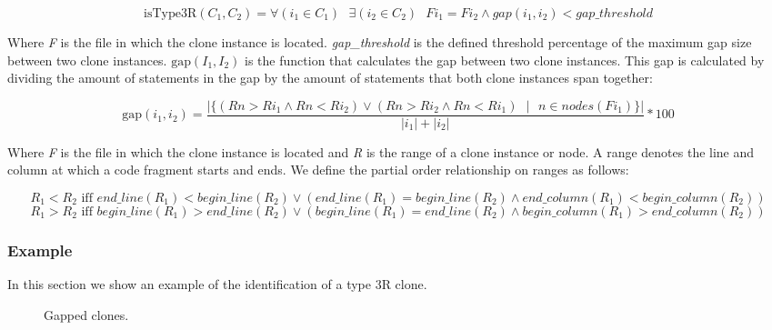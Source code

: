 \begin{equation}\label{eq:istype3r}
\text{isType3R}(C_1, C_2) = \forall (i_1 \in C_1)\text{ } \exists (i_2 \in C_2)\text{ } Fi_1 = Fi_2 \land gap(i_1, i_2) < gap\_threshold
\end{equation}

Where \textit{F} is the file in which the clone instance is located. \textit{gap\_threshold} is the defined threshold percentage of the maximum gap size between two clone instances. $\text{gap}(I_1, I_2)$ is the function that calculates the gap between two clone instances. This gap is calculated by dividing the amount of statements in the gap by the amount of statements that both clone instances span together:

\begin{equation}\label{eq:t3rgap}
\text{gap}(i_1, i_2) = \frac{|\{(Rn>Ri_1 \land Rn<Ri_2) \lor (Rn>Ri_2 \land Rn<Ri_1)\text{ }|\text{ } n \in nodes(Fi_1)\}|}{|i_1| + |i_2|} * 100
\end{equation}

Where \textit{F} is the file in which the clone instance is located and \textit{R} is the range of a clone instance or node. A range denotes the line and column at which a code fragment starts and ends. We define the partial order relationship on ranges as follows:

\begin{equation}\label{eq:rangetotalorder}
R_1 < R_2 \text{ iff } end\_line(R_1) < begin\_line(R_2) \lor (end\_line(R_1) = begin\_line(R_2) \land end\_column(R_1) < begin\_column(R_2))
\end{equation}
\begin{equation}\label{eq:rangetotalorder2}
R_1 > R_2 \text{ iff } begin\_line(R_1) > end\_line(R_2) \lor (begin\_line(R_1) = end\_line(R_2) \land begin\_column(R_1) > end\_column(R_2))
\end{equation}

\subsubsection{Example}
In this section we show an example of the identification of a type 3R clone.

\begin{figure}[H]
\begin{parcolumns}{2}
\end{parcolumns}
\caption{Gapped clones.}
\label{fig:3ropportunities}
\end{figure}

